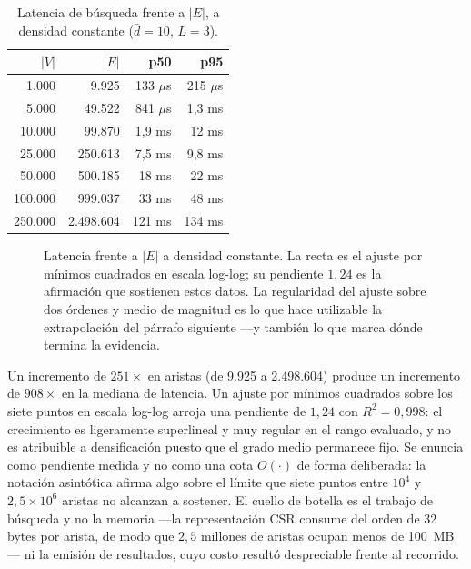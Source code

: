 \documentclass[11pt,a4paper]{article}
\begin{document}
\begin{table}[htbp]
\centering
\caption{Latencia de búsqueda frente a $|E|$, a densidad constante
($\bar{d} = 10$, $L = 3$).}
\begin{tabular}{rrrr}
\toprule
$|V|$ & $|E|$ & \textbf{p50} & \textbf{p95}\\
\midrule
1.000    & 9.925     & 133 $\mu$s & 215 $\mu$s\\
5.000    & 49.522    & 841 $\mu$s & 1,3 ms\\
10.000   & 99.870    & 1,9 ms     & 12 ms\\
25.000   & 250.613   & 7,5 ms     & 9,8 ms\\
50.000   & 500.185   & 18 ms      & 22 ms\\
100.000  & 999.037   & 33 ms      & 48 ms\\
250.000  & 2.498.604 & 121 ms     & 134 ms\\
\bottomrule
\end{tabular}
\end{table}

\begin{figure}[htbp]
\centering
{}
\caption{Latencia frente a $|E|$ a densidad constante. La recta es el ajuste
por mínimos cuadrados en escala log-log; su pendiente $1{,}24$ es la afirmación
que sostienen estos datos. La regularidad del ajuste sobre dos órdenes y medio
de magnitud es lo que hace utilizable la extrapolación del párrafo siguiente
---y también lo que marca dónde termina la evidencia.}
\label{fig:escala}
\end{figure}

Un incremento de $251\times$ en aristas (de 9.925 a 2.498.604) produce un
incremento de $908\times$ en la mediana de latencia. Un ajuste por mínimos
cuadrados sobre los siete puntos en escala log-log arroja una pendiente de
$1{,}24$ con $R^2 = 0{,}998$: el crecimiento es ligeramente superlineal y muy
regular en el rango evaluado, y no es atribuible a densificación puesto que el
grado medio permanece fijo. Se enuncia como pendiente medida y no como una cota
$O(\cdot)$ de forma deliberada: la notación asintótica afirma algo sobre el
límite que siete puntos entre $10^4$ y $2{,}5 \times 10^6$ aristas no alcanzan
a sostener. El cuello
de botella es el trabajo de búsqueda y no la memoria ---la representación CSR
consume del orden de 32 bytes por arista, de modo que $2{,}5$ millones de
aristas ocupan menos de 100~MB--- ni la emisión de resultados, cuyo costo
resultó despreciable frente al recorrido.
\end{document}
